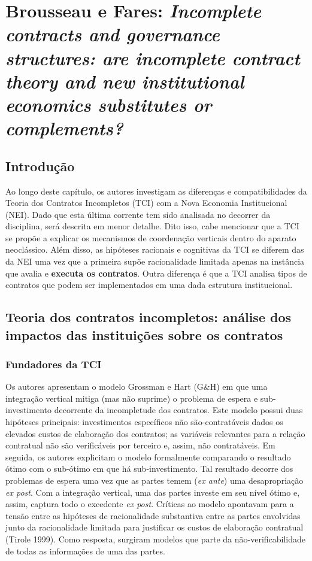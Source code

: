 \section*{Brousseau e Fares: \textit{Incomplete contracts and governance structures: are incomplete contract theory and new institutional economics substitutes or complements?}}

\subsection*{Introdução}

Ao longo deste capítulo, os autores investigam as diferenças e compatibilidades da Teoria dos Contratos Incompletos (TCI) com a Nova Economia Institucional (NEI). Dado que esta última corrente tem sido analisada no decorrer da disciplina, será descrita em menor detalhe. Dito isso, cabe mencionar que a TCI se propõe a explicar os mecanismos de coordenação verticais dentro do aparato neoclássico. Além disso, as hipóteses racionais e cognitivas da TCI se diferem das da NEI uma vez que a primeira supõe racionalidade limitada apenas na instância que avalia e \textbf{executa os contratos}. Outra diferença é que a TCI analisa tipos de contratos que podem ser implementados em uma dada estrutura institucional.

\subsection*{Teoria dos contratos incompletos: análise dos impactos das instituições sobre os contratos}

\subsubsection*{Fundadores da TCI}

Os autores apresentam o modelo Grossman e Hart (G\&H) em que uma integração vertical mitiga (mas não suprime) o problema de espera e sub-investimento decorrente da incompletude dos contratos. Este modelo possui duas hipóteses principais: investimentos específicos não são-contratáveis dados os elevados custos de elaboração dos contratos; as variáveis relevantes para a relação contratual não são verificáveis por terceiro e, assim, não contratáveis. Em seguida, os autores explicitam o modelo formalmente comparando o resultado ótimo com o sub-ótimo em que há sub-investimento. Tal resultado decorre dos problemas de espera uma vez que as partes temem (\textit{ex ante}) uma desapropriação \textit{ex post}. Com a integração vertical, uma das partes investe em seu nível ótimo e, assim, captura todo o excedente \textit{ex post}.
Críticas ao modelo apontavam para a tensão entre as hipóteses de racionalidade substantiva entre as partes envolvidas junto da racionalidade limitada  para justificar os custos de elaboração contratual (Tirole 1999). Como resposta, surgiram modelos que parte da não-verificabilidade de todas as informações de uma das partes.

